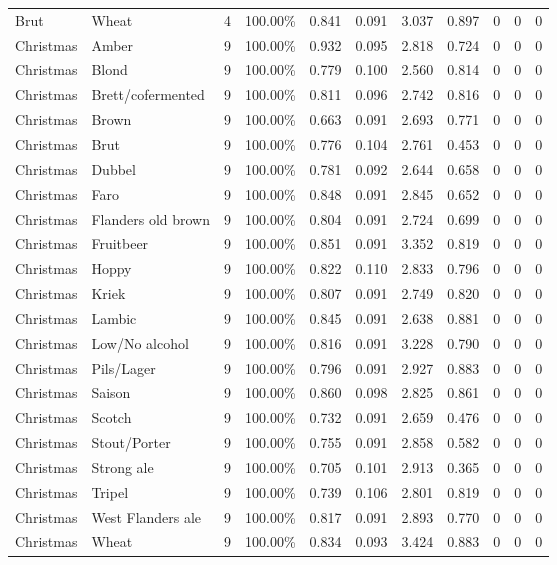 {\begin{longtable}{llrrrrrrrrr}
Brut & Wheat & 4 & 100.00\% & 0.841 & 0.091 & 3.037 & 0.897 & 0 & 0 & 0 \\
Christmas & Amber & 9 & 100.00\% & 0.932 & 0.095 & 2.818 & 0.724 & 0 & 0 & 0 \\
Christmas & Blond & 9 & 100.00\% & 0.779 & 0.100 & 2.560 & 0.814 & 0 & 0 & 0 \\
Christmas & Brett/cofermented & 9 & 100.00\% & 0.811 & 0.096 & 2.742 & 0.816 & 0 & 0 & 0 \\
Christmas & Brown & 9 & 100.00\% & 0.663 & 0.091 & 2.693 & 0.771 & 0 & 0 & 0 \\
Christmas & Brut & 9 & 100.00\% & 0.776 & 0.104 & 2.761 & 0.453 & 0 & 0 & 0 \\
Christmas & Dubbel & 9 & 100.00\% & 0.781 & 0.092 & 2.644 & 0.658 & 0 & 0 & 0 \\
Christmas & Faro & 9 & 100.00\% & 0.848 & 0.091 & 2.845 & 0.652 & 0 & 0 & 0 \\
Christmas & Flanders old brown & 9 & 100.00\% & 0.804 & 0.091 & 2.724 & 0.699 & 0 & 0 & 0 \\
Christmas & Fruitbeer & 9 & 100.00\% & 0.851 & 0.091 & 3.352 & 0.819 & 0 & 0 & 0 \\
Christmas & Hoppy & 9 & 100.00\% & 0.822 & 0.110 & 2.833 & 0.796 & 0 & 0 & 0 \\
Christmas & Kriek & 9 & 100.00\% & 0.807 & 0.091 & 2.749 & 0.820 & 0 & 0 & 0 \\
Christmas & Lambic & 9 & 100.00\% & 0.845 & 0.091 & 2.638 & 0.881 & 0 & 0 & 0 \\
Christmas & Low/No alcohol & 9 & 100.00\% & 0.816 & 0.091 & 3.228 & 0.790 & 0 & 0 & 0 \\
Christmas & Pils/Lager & 9 & 100.00\% & 0.796 & 0.091 & 2.927 & 0.883 & 0 & 0 & 0 \\
Christmas & Saison & 9 & 100.00\% & 0.860 & 0.098 & 2.825 & 0.861 & 0 & 0 & 0 \\
Christmas & Scotch & 9 & 100.00\% & 0.732 & 0.091 & 2.659 & 0.476 & 0 & 0 & 0 \\
Christmas & Stout/Porter & 9 & 100.00\% & 0.755 & 0.091 & 2.858 & 0.582 & 0 & 0 & 0 \\
Christmas & Strong ale & 9 & 100.00\% & 0.705 & 0.101 & 2.913 & 0.365 & 0 & 0 & 0 \\
Christmas & Tripel & 9 & 100.00\% & 0.739 & 0.106 & 2.801 & 0.819 & 0 & 0 & 0 \\
Christmas & West Flanders ale & 9 & 100.00\% & 0.817 & 0.091 & 2.893 & 0.770 & 0 & 0 & 0 \\
Christmas & Wheat & 9 & 100.00\% & 0.834 & 0.093 & 3.424 & 0.883 & 0 & 0 & 0 \\

\end{longtable}}
